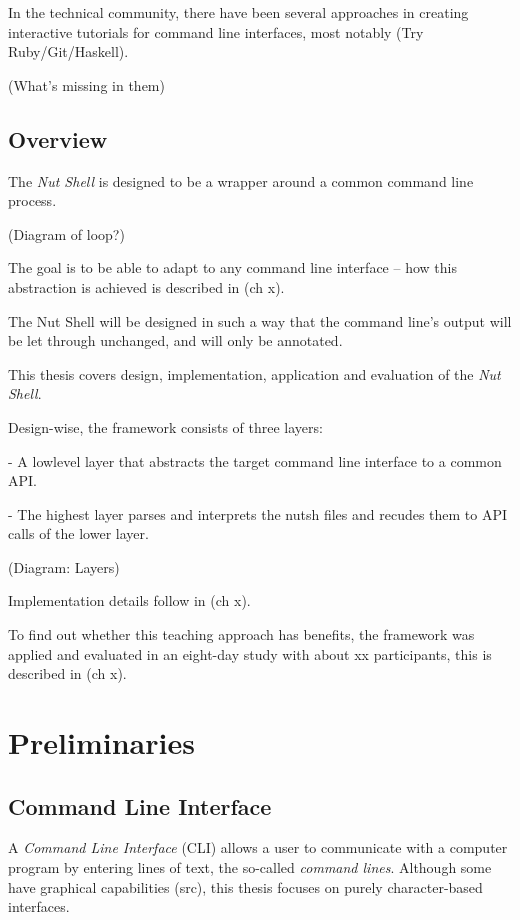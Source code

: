 \documentclass[twoside]{scrreprt}
\begin{document}
In the technical community, there have been several approaches in creating interactive tutorials for command line interfaces, most notably (Try Ruby/Git/Haskell).

(What's missing in them)

\section{Overview}

The \emph{Nut Shell} is designed to be a wrapper around a common command line process.

(Diagram of loop?)

The goal is to be able to adapt to any command line interface -- how this abstraction is achieved is described in (ch x).

The Nut Shell will be designed in such a way that the command line's output will be let through unchanged, and will only be annotated.

This thesis covers design, implementation, application and evaluation of the \emph{Nut Shell}.

Design-wise, the framework consists of three layers:

- A lowlevel layer that abstracts the target command line interface to a common API.

- The highest layer parses and interprets the nutsh files and recudes them to API calls of the lower layer.

(Diagram: Layers)

Implementation details follow in (ch x).

To find out whether this teaching approach has benefits, the framework was applied and evaluated in an eight-day study with about xx participants, this is described in (ch x).

\chapter{Preliminaries}

\section{Command Line Interface}

A \emph{Command Line Interface} (\textsc{CLI}) allows a user to communicate with a computer program by entering lines of text, the so-called \emph{command lines}. Although some have graphical capabilities (src), this thesis focuses on purely character-based interfaces.
\end{document}
